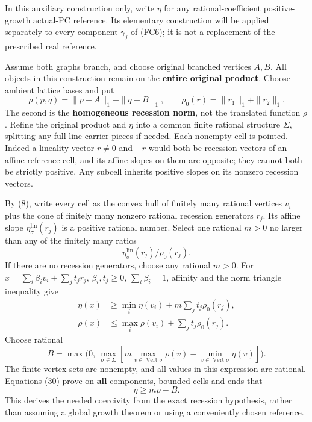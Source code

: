 \documentclass[
  11pt,
]{article}
\begin{document}
In this auxiliary construction only, write \(\eta\) for any
rational-coefficient positive-growth actual-PC reference. Its elementary
construction will be applied separately to every component \(\gamma_j\)
of (FC6); it is not a replacement of the prescribed real reference.

Assume both graphs branch, and choose original branched vertices
\(A,B\). All objects in this construction remain on the \textbf{entire
original product}. Choose ambient lattice bases and put \[
\rho(p,q)=\|p-A\|_1+\|q-B\|_1,\qquad
\rho_0(r)=\|r_1\|_1+\|r_2\|_1.                               \tag{28}
\] The second is the \textbf{homogeneous recession norm}, not the
translated function \(\rho\). Refine the original product and \(\eta\)
into a common finite rational structure \(\Sigma\), splitting any
full-line carrier pieces if needed. Each nonempty cell is pointed.
Indeed a lineality vector \(r\ne0\) and \(-r\) would both be recession
vectors of an affine reference cell, and its affine slopes on them are
opposite; they cannot both be strictly positive. Any subcell inherits
positive slopes on its nonzero recession vectors.

By (8), write every cell as the convex hull of finitely many rational
vertices \(v_i\) plus the cone of finitely many nonzero rational
recession generators \(r_j\). Its affine slope
\(\eta_\sigma^{\mathrm{lin}}(r_j)\) is a positive rational number.
Select one rational \(m>0\) no larger than any of the finitely many
ratios \[
       \eta_\sigma^{\mathrm{lin}}(r_j)/\rho_0(r_j).            \tag{29}
\] If there are no recession generators, choose any rational \(m>0\).
For \(x=\sum_i\beta_iv_i+\sum_jt_jr_j\), \(\beta_i,t_j\geq0\),
\(\sum_i\beta_i=1\), affinity and the norm triangle inequality give \[
\begin{split}
\eta(x)&\geq\min_i\eta(v_i)+m\sum_jt_j\rho_0(r_j),\\
\rho(x)&\leq\max_i\rho(v_i)+\sum_jt_j\rho_0(r_j).
\end{split}                                                        \tag{30}
\] Choose rational \[
B=\max\bigl(0,\ \max_{\sigma\in\Sigma}
                 [m\max_{v\in\operatorname{Vert}\sigma}\rho(v)
                        -\min_{v\in\operatorname{Vert}\sigma}\eta(v)]\bigr).
\] The finite vertex sets are nonempty, and all values in this
expression are rational. Equations (30) prove on \textbf{all}
components, bounded cells and ends that \[
                         \eta\geq m\rho-B.                 \tag{31}
\] This derives the needed coercivity from the exact recession
hypothesis, rather than assuming a global growth theorem or using a
conveniently chosen reference.
\end{document}
